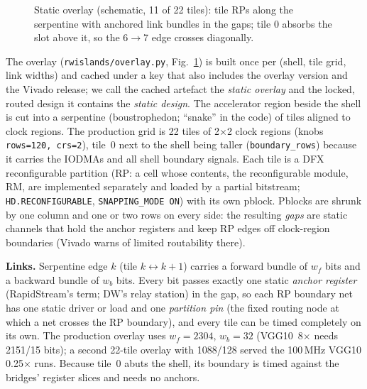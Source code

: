 \documentclass[10pt,twocolumn]{article}
\newcommand{\code}[1]{\texttt{\small #1}}
\begin{document}
\begin{figure}[t]
\caption{Static overlay (schematic, 11 of 22 tiles): tile RPs along the serpentine with anchored link bundles in the gaps; tile 0 absorbs the slot above it, so the 6$\to$7 edge crosses diagonally.}
\label{fig:overlay}
\end{figure}

The overlay (\code{rwislands/overlay.py}, Fig.~\ref{fig:overlay}) is built once per (shell,
tile grid, link widths) and cached under a key that also includes the overlay version and the
Vivado release; we call the cached artefact the \emph{static overlay} and the locked, routed
design it contains the \emph{static design}. The accelerator region beside the shell is cut into
a serpentine (boustrophedon; ``snake'' in the code) of tiles aligned to clock regions. The
production grid is 22 tiles of 2$\times$2 clock regions (knobs \code{rows=120, crs=2}), tile~0
next to the shell being taller (\code{boundary\_rows}) because it carries the IODMAs and all
shell boundary signals. Each tile is a DFX reconfigurable partition (RP: a cell whose contents,
the reconfigurable module, RM, are implemented separately and loaded by a partial bitstream;
\code{HD.RECONFIGURABLE}, \code{SNAPPING\_MODE ON}) with its own pblock. Pblocks are shrunk by one
column and one or two rows on every side: the resulting \emph{gaps} are static channels that
hold the anchor registers and keep RP edges off clock-region boundaries (Vivado warns of limited
routability there).

\textbf{Links.} Serpentine edge $k$ (tile $k\leftrightarrow k{+}1$) carries a forward bundle of
$w_f$ bits and a backward bundle of $w_b$ bits. Every bit passes exactly one static \emph{anchor
register} (RapidStream's term; DW's relay station) in the gap, so each RP boundary net has one
static driver or load and one \emph{partition pin} (the fixed routing node at which a net
crosses the RP boundary), and every tile can be timed completely on its own. The production
overlay uses $w_f=2304$, $w_b=32$ (VGG10~8$\times$ needs 2151/15 bits); a second 22-tile overlay
with 1088/128 served the 100\,MHz VGG10 0.25$\times$ runs. Because tile~0 abuts the shell, its
boundary is timed against the bridges' register slices and needs no anchors.
\end{document}
